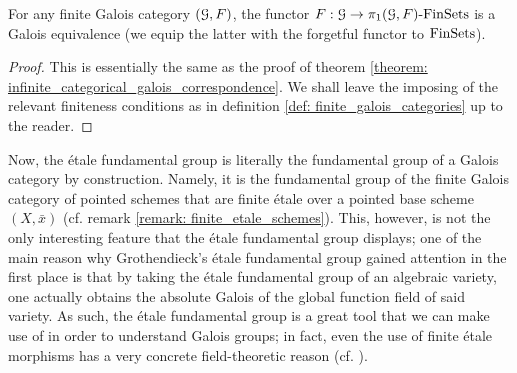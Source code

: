             \begin{theorem} \label{theorem: finite_categorical_galois_correspondence}
                \cite[\href{https://stacks.math.columbia.edu/tag/0BN4}{Tag 0BN4}]{stacks} For any finite Galois category $(\mathcal{G}, F)$, the functor $F: \mathcal{G} \to \pi_1(\mathcal{G}, F)\text{-}\mathrm{Fin}\mathrm{Sets}$ is a Galois equivalence (we equip the latter with the forgetful functor to $\mathrm{Fin}\mathrm{Sets}$).
            \end{theorem}
                \begin{proof}
                    This is essentially the same as the proof of theorem \ref{theorem: infinite_categorical_galois_correspondence}. We shall leave the imposing of the relevant finiteness conditions as in definition \ref{def: finite_galois_categories} up to the reader. 
                \end{proof}
            
            Now, the \'etale fundamental group is literally the fundamental group of a Galois category by construction. Namely, it is the fundamental group of the finite Galois category of pointed schemes that are finite \'etale over a pointed base scheme $(X, \bar{x})$ (cf. remark \ref{remark: finite_etale_schemes}). This, however, is not the only interesting feature that the \'etale fundamental group displays; one of the main reason why Grothendieck's \'etale fundamental group gained attention in the first place is that by taking the \'etale fundamental group of an algebraic variety, one actually obtains the absolute Galois of the global function field of said variety. As such, the \'etale fundamental group is a great tool that we can make use of in order to understand Galois groups; in fact, even the use of finite \'etale morphisms has a very concrete field-theoretic reason (cf. \cite[\href{https://stacks.math.columbia.edu/tag/00U3}{Tag 00U3}]{stacks}).
            

